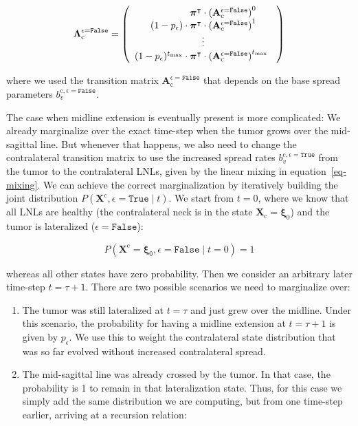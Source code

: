 \documentclass[
  sn-mathphys-num,
]{sn-jnl}
\providecommand{\tightlist}{%
  \setlength{\itemsep}{0pt}\setlength{\parskip}{0pt}}\usepackage{longtable,booktabs,array}
\begin{document}
\[
\boldsymbol{\Lambda}_\text{c}^{\epsilon=\texttt{False}} =
\left(
\begin{array}{r}
\boldsymbol{\pi}^\intercal \cdot \left( \mathbf{A}_\text{c}^{\epsilon=\texttt{False}} \right)^{0\phantom{t_\text{max}}} \\
(1-p_\epsilon) \cdot \boldsymbol{\pi}^\intercal \cdot \left( \mathbf{A}_\text{c}^{\epsilon=\texttt{False}} \right)^{1\phantom{t_\text{max}}} \\
\hfill \vdots \hfill \\
(1-p_\epsilon)^{t_\text{max}} \cdot \boldsymbol{\pi}^\intercal \cdot \left( \mathbf{A}_\text{c}^{\epsilon=\texttt{False}} \right)^{t_\text{max}\phantom{0}} \\
\end{array}
\right)
\]

where we used the transition matrix
\(\mathbf{A}_\text{c}^{\epsilon=\texttt{False}}\) that depends on the
base spread parameters \(b_v^{\text{c},\epsilon=\texttt{False}}\).

The case when midline extension is eventually present is more
complicated: We already marginalize over the exact time-step when the
tumor grows over the mid-sagittal line. But whenever that happens, we
also need to change the contralateral transition matrix to use the
increased spread rates \(b_v^{\text{c}, \epsilon=\texttt{True}}\) from
the tumor to the contralateral LNLs, given by the linear mixing in
equation~\ref{eq-mixing}. We can achieve the correct marginalization by
iteratively building the joint distribution
\(P \left( \mathbf{X}^\text{c}, \epsilon=\texttt{True} \mid t \right)\).
We start from \(t=0\), where we know that all LNLs are healthy (the
contralateral neck is in the state
\(\mathbf{X}_\text{c}=\boldsymbol{\xi}_0\)) and the tumor is lateralized
(\(\epsilon=\texttt{False}\)):

\[
P \left( \mathbf{X}^\text{c} = \boldsymbol{\xi}_0, \epsilon=\texttt{False} \mid t=0 \right) = 1
\]

whereas all other states have zero probability. Then we consider an
arbitrary later time-step \(t=\tau+1\). There are two possible scenarios
we need to marginalize over:

\begin{enumerate}
\def\labelenumi{\arabic{enumi}.}
\tightlist
\item
  The tumor was still lateralized at \(t=\tau\) and just grew over the
  midline. Under this scenario, the probability for having a midline
  extension at \(t=\tau+1\) is given by \(p_\epsilon\). We use this to
  weight the contralateral state distribution that was so far evolved
  without increased contralateral spread.
\item
  The mid-sagittal line was already crossed by the tumor. In that case,
  the probability is 1 to remain in that lateralization state. Thus, for
  this case we simply add the same distribution we are computing, but
  from one time-step earlier, arriving at a recursion relation:
\end{enumerate}
\end{document}
